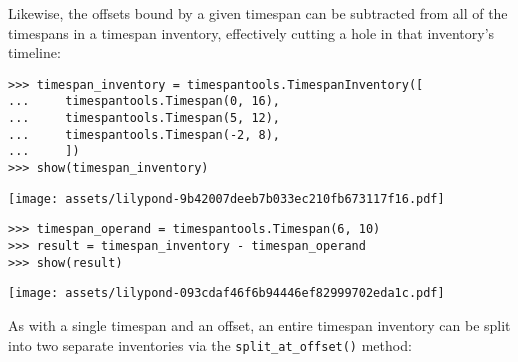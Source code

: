 \noindent Likewise, the offsets bound by a given timespan can be subtracted
from all of the timespans in a timespan inventory, effectively cutting a hole
in that inventory's timeline:

\begin{comment}
<abjad>
timespan_inventory = timespantools.TimespanInventory([
    timespantools.Timespan(0, 16),
    timespantools.Timespan(5, 12),
    timespantools.Timespan(-2, 8),
    ])
show(timespan_inventory)
timespan_operand = timespantools.Timespan(6, 10)
result = timespan_inventory - timespan_operand
show(result)
</abjad>
\end{comment}

\begin{singlespacing}
\vspace{-0.5\baselineskip}
\begin{lstlisting}
>>> timespan_inventory = timespantools.TimespanInventory([
...     timespantools.Timespan(0, 16),
...     timespantools.Timespan(5, 12),
...     timespantools.Timespan(-2, 8),
...     ])
>>> show(timespan_inventory)
\end{lstlisting}
\noindent\texttt{[image: assets/lilypond-9b42007deeb7b033ec210fb673117f16.pdf]}
\begin{lstlisting}
>>> timespan_operand = timespantools.Timespan(6, 10)
>>> result = timespan_inventory - timespan_operand
>>> show(result)
\end{lstlisting}
\noindent\texttt{[image: assets/lilypond-093cdaf46f6b94446ef82999702eda1c.pdf]}
\end{singlespacing}

\noindent As with a single timespan and an offset, an entire timespan inventory
can be split into two separate inventories via the \texttt{split\_at\_offset()}
method:

\begin{comment}
<abjad>
timespan_inventory = timespantools.TimespanInventory([
    timespantools.Timespan(0, 3),
    timespantools.Timespan(3, 6),
    timespantools.Timespan(6, 10),
    ])
show(timespan_inventory)
left, right = timespan_inventory.split_at_offset(4)
show(left, range_=(0, 10))
show(right, range_=(0, 10))
</abjad>
\end{comment}

